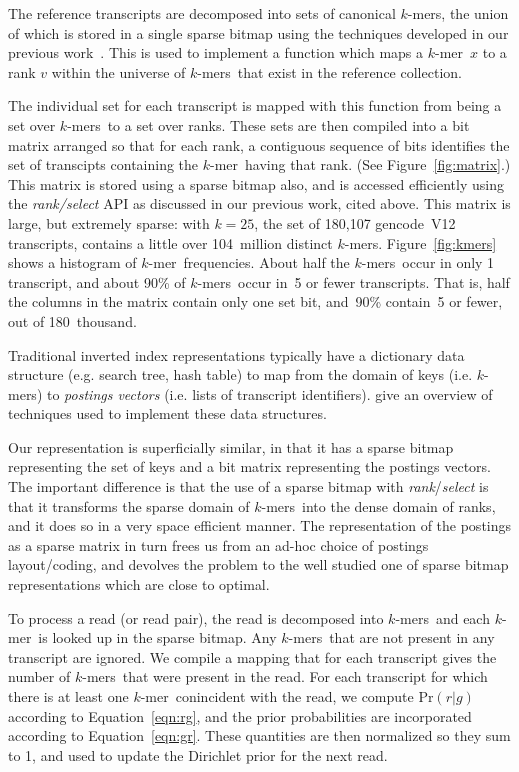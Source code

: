 \documentclass{bioinfo}
\newcommand{\kmer}{$k$-mer{}}
\newcommand{\kmers}{$k$-mers{}}
\begin{document}
The reference transcripts are decomposed into sets of canonical \kmers, the union
of which is stored in a single sparse bitmap using the techniques developed in our
previous work~\citep{Conway:2011p17913}.
This is used to implement a function which maps a \kmer\ $x$ to a
rank $v$ within the universe of \kmers\ that exist in the reference collection.

The individual set for each transcript is mapped with this function from being a
set over \kmers\ to a set over ranks. These sets are then compiled into a bit matrix
arranged so that for each rank,
a contiguous sequence of bits identifies the set of transcipts containing
the \kmer\ having that rank. (See Figure~\ref{fig:matrix}.)
This matrix is stored using a sparse bitmap also, and is accessed efficiently using
the \textit{rank/select} API as discussed in our previous work, cited above.
This matrix is large, but extremely sparse: with $k=25$, the set of 180,107 gencode~V12 transcripts,
contains a little over 104~million distinct \kmers. Figure~\ref{fig:kmers} shows
a histogram of \kmer\ frequencies. About half the \kmers\ occur in
only 1 transcript, and about 90\% of \kmers\ occur in~5 or fewer transcripts. That is,
half the columns in the matrix contain only one set bit, and~90\% contain~5 or fewer,
out of 180~thousand.

Traditional inverted index representations typically have a dictionary data structure
(e.g. search tree, hash table) to map from the domain of keys (i.e. \kmers{}) to \textit{postings vectors}
(i.e. lists of transcript identifiers).
\citet{ZobelMoffat:2006} give an overview of techniques used to implement these data structures.

Our representation is superficially similar, in that it has a sparse bitmap representing
the set of keys and a bit matrix representing the postings vectors.
The important difference is that the use of a sparse bitmap with \textit{rank}/\textit{select}
is that it transforms the sparse domain of \kmers\ into the dense domain of ranks, and it does
so in a very space efficient manner.
The representation of the postings as a sparse matrix in turn frees us from an ad-hoc
choice of postings layout/coding, and devolves the problem to the well studied one of
sparse bitmap representations which are close to optimal.

To process a read (or read pair), the read is decomposed into \kmers\ and each \kmer\ is
looked up in the sparse bitmap. Any \kmers\ that are not present in any transcript are ignored.
We compile a mapping that for each transcript gives the number of \kmers\ that were present in the read. For each transcript for which there is at least one \kmer\ conincident with the read,
we compute $\textrm{Pr}(r|g)$ according to Equation~\ref{eqn:rg}, and
the prior probabilities are incorporated according to Equation~\ref{eqn:gr}.
These quantities are then normalized so they sum to 1, and used to update the Dirichlet prior
for the next read.
\end{document}
